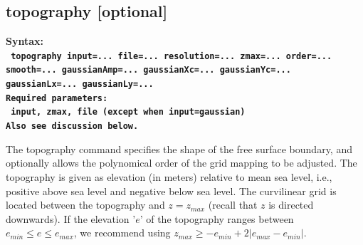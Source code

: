 \documentclass[11pt]{report}
\begin{document}
\subsection{topography [optional]}
\label{keyword:topo}
\begin{flushleft}
\bf
Syntax:\\
\tt 
topography input=... file=... resolution=... zmax=... order=... smooth=... gaussianAmp=... gaussianXc=... gaussianYc=... gaussianLx=... gaussianLy=...\\
\bf 
Required parameters:\\
\tt 
input, zmax, file (except when input=gaussian)\\
\rm Also see discussion below.
\end{flushleft}
The topography command specifies the shape of the free surface boundary, and optionally allows the
polynomical order of the grid mapping to be adjusted. The topography is given as elevation (in
meters) relative to mean sea level, i.e., positive above sea level and negative below sea level. The
curvilinear grid is located between the topography and $z=z_{max}$ (recall that $z$ is directed
downwards). If the elevation '$e$' of the topography ranges between $e_{min}\leq e \leq e_{max}$, we
recommend using $z_{max} \geq -e_{min} + 2|e_{max} - e_{min}|$.
\end{document}
